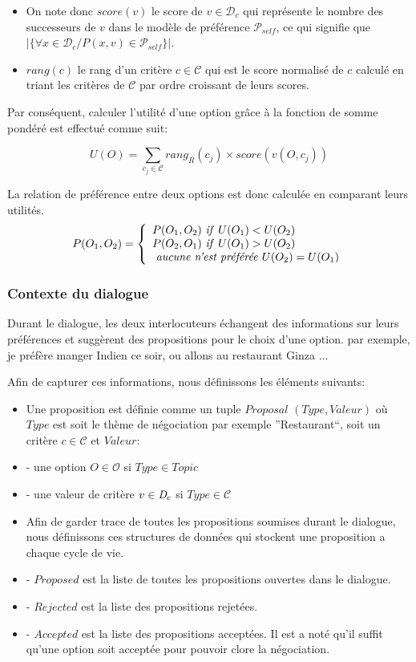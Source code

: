 \documentclass [french]{sig-alternate-05-2015}
\begin{document}
 \begin{itemize}
 	\item On note donc $score(v)$ le score de $v \in \mathcal{D}_{c}$ qui représente le nombre des successeurs de  $v$  dans le modèle de préférence $\mathcal{P}_{self}$, ce qui signifie que $|\{ \forall x \in \mathcal{D}_{c} / P (x,v) \in \mathcal{P}_{self}\}|$.
 	\item $rang(c)$ le rang d'un critère $c \in \mathcal{C}$ qui est le score normalisé de $c$ calculé en triant les critères de $\mathcal{C}$ par ordre croissant de leurs scores.
 \end{itemize}
Par conséquent, calculer l'utilité d'une option grâce à la fonction de somme pondéré est effectué comme suit:

\[U(O) = \sum_{c_j \in \mathcal{C}}  rang_R(c_j) \times score\left( v(O, c_j) \right) \] 


\par La relation de préférence entre deux options est donc calculée en comparant leurs utilités. 
\[ P(O_1, O_2)  = \left \{
\begin{array}{l}
P(O_1, O_2)$ \textit{if}  $U(O_1) < U(O_2) \\
P(O_2, O_1)$  \textit{if} $U(O_1) > U(O_2)  \\
$  \textit{aucune n'est préférée}  $U(O_2) = U(O_1)\\
\end{array}
\right .\]


\subsubsection{Contexte du dialogue}
\par Durant le dialogue, les deux interlocuteurs échangent des informations sur leurs préférences et suggèrent des propositions pour le choix d'une option. par exemple, je préfère manger Indien ce soir, ou allons au restaurant Ginza ...

Afin de capturer ces informations, nous définissons les éléments suivants:
\begin{itemize}
	\item Une proposition est définie comme un tuple $Proposal$ $(Type, Valeur)$ où $Type$ est soit le thème de négociation par exemple ''Restaurant``, soit un critère $c \in \mathcal{C}$ et $Valeur$:
	\item -  une option $O \in \mathcal{O}$ si $Type \in Topic$ 
	\item - une valeur de critère $v \in \emph{D}_c$ si $Type \in \mathcal{C}$
	\item Afin de garder trace de toutes les propositions soumises durant le dialogue, nous définissons ces structures de données qui stockent une proposition a chaque cycle de vie. 
	\item - $ Proposed$ est la liste de toutes les propositions ouvertes dans le dialogue.
	\item - $ Rejected$  est la liste des propositions rejetées.
	\item - $ Accepted$  est la liste des propositions acceptées. Il est a noté qu'il suffit qu'une option soit acceptée pour pouvoir clore la négociation. 
\end{itemize}
\end{document}
